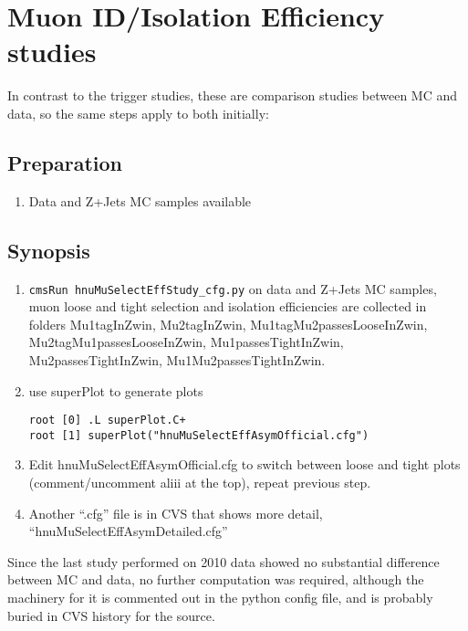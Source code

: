 \documentclass[english]{article}
\begin{document}
\section{Muon ID/Isolation Efficiency studies}

In contrast to the trigger studies, these are comparison studies between
MC and data, so the same steps apply to both initially:

\subsection{Preparation}
%
\begin{enumerate}
\item Data and Z+Jets MC samples available
\end{enumerate}

\subsection{Synopsis}
%
\begin{enumerate}
%
\item \verb#cmsRun hnuMuSelectEffStudy_cfg.py# on data and Z+Jets MC
samples, muon loose and tight selection and isolation efficiencies are
collected in folders Mu1tagInZwin, Mu2tagInZwin,
Mu1tagMu2passesLooseInZwin, Mu2tagMu1passesLooseInZwin,
Mu1passesTightInZwin, Mu2passesTightInZwin, Mu1Mu2passesTightInZwin.
%
\item use superPlot to generate plots
%
\begin{lstlisting}
root [0] .L superPlot.C+
root [1] superPlot("hnuMuSelectEffAsymOfficial.cfg")
\end{lstlisting}
%
\item Edit hnuMuSelectEffAsymOfficial.cfg to switch between loose and
tight plots (comment/uncomment aliii at the top), repeat previous
step.
%
\item Another ``.cfg'' file is in CVS that shows more detail,
 ``hnuMuSelectEffAsymDetailed.cfg''
\end{enumerate}

Since the last study performed on 2010 data showed no substantial
difference between MC and data, no further computation was required,
although the machinery for it is commented out in the python config
file, and is probably buried in CVS history for the source.
\end{document}
